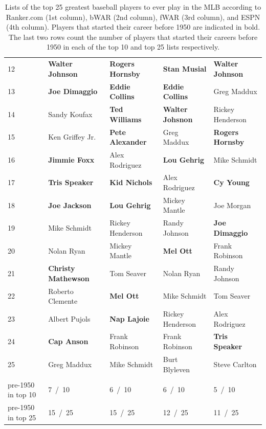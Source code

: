 \documentclass[11pt]{article}\usepackage[]{graphicx}\usepackage[]{color}
\begin{document}
\begin{table}[h!]
\begin{center}
\begin{tabular}{lllll}
12 & {\bf Walter Johnson}    & {\bf Rogers Hornsby} & {\bf Stan Musial}    & {\bf Walter Johnson} \\
13 & {\bf Joe Dimaggio}      & {\bf Eddie Collins}  & {\bf Eddie Collins}  & Greg Maddux          \\
14 & Sandy Koufax            & {\bf Ted Williams}   & {\bf Walter Johsnon} & Rickey Henderson     \\ 
15 & Ken Griffey Jr.         & {\bf Pete Alexander} & Greg Maddux          & {\bf Rogers Hornsby} \\
16 & {\bf Jimmie Foxx}       & Alex Rodriguez       & {\bf Lou Gehrig}     & Mike Schmidt         \\
17 & {\bf Tris Speaker}      & {\bf Kid Nichols}    & Alex Rodriguez       & {\bf Cy Young}       \\
18 & {\bf Joe Jackson}       & {\bf Lou Gehrig}     & Mickey Mantle        & Joe Morgan           \\
19 & Mike Schmidt            & Rickey Henderson     & Randy Johnson        & {\bf Joe Dimaggio}   \\
20 & Nolan Ryan              & Mickey Mantle        & {\bf Mel Ott}        & Frank Robinson       \\
21 & {\bf Christy Mathewson} & Tom Seaver           & Nolan Ryan           & Randy Johnson        \\
22 & Roberto Clemente        & {\bf Mel Ott}        & Mike Schmidt         & Tom Seaver           \\
23 & Albert Pujols           & {\bf Nap Lajoie}     & Rickey Henderson     & Alex Rodriguez       \\
24 & {\bf Cap Anson}         & Frank Robinson       & Frank Robinson       & {\bf Tris Speaker}   \\
25 & Greg Maddux             & Mike Schmidt         & Burt Blyleven        & Steve Carlton        \\
 & & & & \\
pre-1950 in top 10 &   7 \,/\, 10  &   6 \,/\, 10  &   6 \,/\, 10  &   5 \,/\, 10  \\
pre-1950 in top 25 &  15 \,/\, 25  &  15 \,/\, 25  &  12 \,/\, 25  &  11 \,/\, 25  \\
\hline
\end{tabular}
\end{center}
\caption{Lists of the top 25 greatest baseball players to ever play in the 
  MLB according to Ranker.com (1st column), bWAR (2nd column), 
  fWAR (3rd column), and ESPN (4th column). Players that started their career 
  before 1950 are indicated in bold. The last two rows count the number of players 
  that started their careers before 1950 in each of the top 10 and top 25 lists 
  respectively.}
\label{top25}
\end{table}
\end{document}
